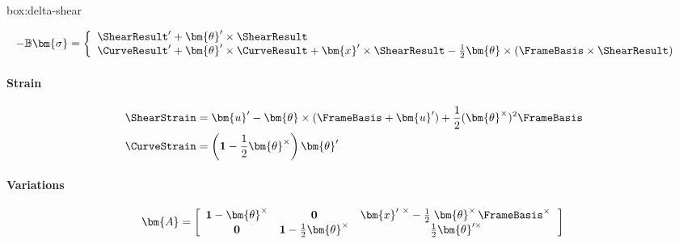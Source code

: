 \begin{ambox}{box:delta-shear}

\begin{equation*}
\begin{aligned}
-\mathbb{B} \bm{\sigma}
&= \left\{\begin{array}{l}
\ShearResult' + \bm{\theta}'\times\ShearResult \\
\CurveResult' +  \bm{\theta}' \times \CurveResult + \bm{x}'\times\ShearResult - \frac{1}{2} \bm{\theta}\times(\FrameBasis \times\ShearResult)
\end{array}
\right.
\end{aligned}
\end{equation*}

\paragraph{Strain}
\begin{equation*}
\begin{aligned}
\ShearStrain &= \bm{u}^{\prime} - \bm{\theta}\times(\FrameBasis  + \bm{u}^{\prime})+ \frac{1}{2}(\bm{\theta}^{\times})^{2}\FrameBasis 
 \\
\CurveStrain &= 
\left(\mathbf{1} - \frac{1}{2}\bm{\theta}^\times\right)\bm{\theta}^{\prime}
\end{aligned}
\end{equation*}

\paragraph{Variations}
\begin{equation*}
\bm{A} = 
\left[\begin{array}{ccc}
\mathbf{1} - \bm{\theta}^{\times}& \mathbf{0} & \bm{x}^{\prime~\times} - \frac{1}{2}\left.\bm{\theta}^{\times}\,\FrameBasis^{\times}\right.\\
\mathbf{0} & \mathbf{1} -\frac{1}{2}\bm{\theta}^{\times} & \frac{1}{2}\bm{\theta}^{\prime \times}
\end{array}\right] \\
\end{equation*}
\end{ambox}
